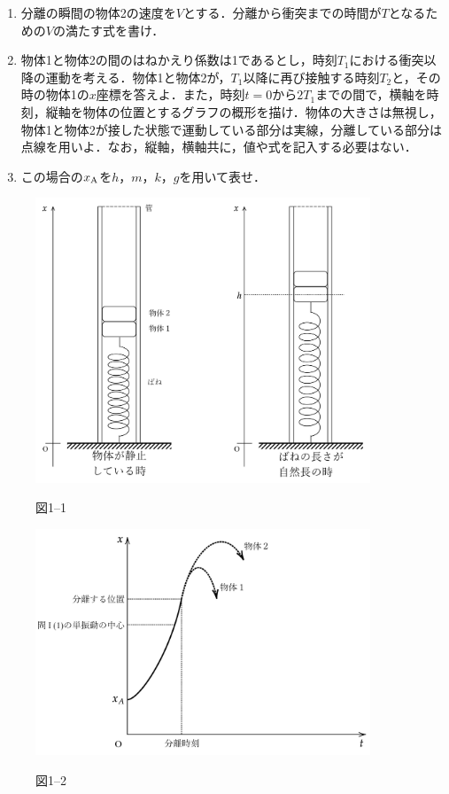 \begin{enumerate}[I]
\begin{enumerate}[(1)]
    \item {\hzw}分離の瞬間の物体2の速度を$V$とする．分離から衝突までの時間が$T$となるための$V$の満たす式を書け．
    \item {\hzw}物体1と物体2の間のはねかえり係数は1であるとし，時刻$T_1$における衝突以降の運動を考える．物体1と物体2が，$T_1$以降に再び接触する時刻$T_2$と，その時の物体1の$x$座標を答えよ．また，時刻$t=0$から$2T_1$までの間で，横軸を時刻，縦軸を物体の位置とするグラフの概形を描け．物体の大きさは無視し，物体1と物体2が接した状態で運動している部分は実線，分離している部分は点線を用いよ．なお，縦軸，横軸共に，値や式を記入する必要はない．
    \item {\hzw}この場合の$x_\mathrm{A}$を$h$，$m$，$k$，$g$を用いて表せ．
  \end{enumerate}
\end{enumerate}

\begin{figure}[H]
  \centering
  \includegraphics[width=10cm]{fig/fig_1_9_1.pdf}
  
  図1--1
\end{figure}
\begin{figure}[H]
  \centering
  \includegraphics[width=10cm]{fig/fig_1_9_2.pdf}
  \hspace{2cm}
  
  図1--2
\end{figure}


